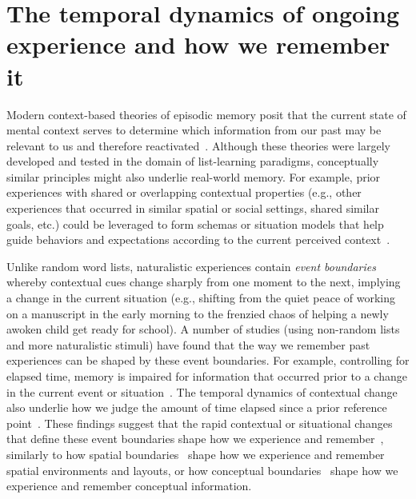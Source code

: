 \documentclass{article}
\providecommand{\DIFaddend}{} %
\DeclareRobustCommand{\DIFaddend}{\DIFOaddend \let\includegraphics\DIFOincludegraphics} %
\begin{document}
\DIFaddend \section*{The temporal dynamics of ongoing experience and how we remember it}
Modern context-based theories of episodic memory posit that the current state of mental context serves to determine which information from our past may be relevant to us and therefore reactivated~\citep[e.g., ][]{PolyEtal09}. Although these theories were largely developed and tested in the domain of list-learning paradigms, conceptually similar principles might also underlie real-world memory.  For example, prior experiences with shared or overlapping contextual properties (e.g., other experiences that occurred in similar spatial or social settings, shared similar goals, etc.) could be leveraged to form schemas or situation models that help guide behaviors and expectations according to the current perceived context~\citep{RangRitc12, BaldEtal18, AlyEtal18}.

Unlike random word lists, naturalistic experiences contain \textit{event boundaries} whereby contextual cues change sharply from one moment to the next, implying a change in the current situation (e.g., shifting from the quiet peace of working on a manuscript in the early morning to the frenzied chaos of helping a newly awoken child get ready for school).  A number of studies (using non-random lists and more naturalistic stimuli) have found that the way we remember past experiences can be shaped by these event boundaries.  For example, controlling for elapsed time, memory is impaired for information that occurred prior to a change in the current event or situation~\citep[e.g., ][]{RadvCope06, SwalEtal09, SwalEtal11, EzzyDava11, MannEtal16}.  The temporal dynamics of contextual change also underlie how we judge the amount of time elapsed since a prior reference point~\citep{BlocReed78, SahaSmit14}.  These findings suggest that the rapid contextual or situational changes that define these event boundaries shape how we experience and remember~\citep{DuBrDava16}, similarly to how spatial boundaries~\citep[e.g., environmental barriers;][]{McKeBuzs16, BrunEtal18} shape how we experience and remember spatial environments and layouts, or how conceptual boundaries~\citep[e.g., distinctions between semantic categories;][]{BrunEtal18} shape how we experience and remember conceptual information.
\end{document}
